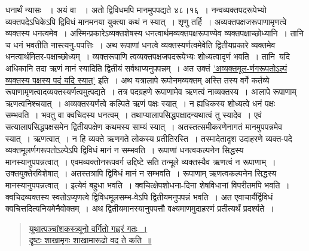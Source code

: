 \documentclass[11pt, openany]{book}
\begin{document}
\newpage

\begin{sloppypar}
\noindent धनार्थं न्यासः ~। अयं वा ~। अतो द्विविधमपि मानमुपपद्यते ४८।१६~। नन्वव्यक्तपदरूपेभ्यो व्यक्तपदेऽधिकेऽपि द्विविधं मानमनया युक्त्या कथं न स्यात्~। शृणु तर्हि~। अव्यक्तपक्षजरूपाणामृणत्वे व्यक्तस्य धनत्वमेव~। अस्मिन्प्रकारेऽव्यक्तशेषस्य धनत्वार्थमव्यक्तपक्षरूपाण्येव व्यक्तपक्षाच्छोध्यानि~। तानि च धनं भवतीति नास्त्यनु-पपत्तिः~। अथ रूपाणां धनत्वे व्यक्तस्यर्णत्वमेवेति द्वितीयप्रकारे व्यक्तमेव धनत्वार्थमितर-पक्षाच्छोध्यम्~। व्यक्तरूपाणि त्वव्यक्तपक्षजपदरूपेभ्यः शोध्यत्वादृणं भवति~। तानि~यदि अधिकानि तदा ऋणं मानं स्यादिति द्वितीयं सर्वथाप्यनुपपन्नम्~। अत उक्तं \hyperref[8.115]{'अव्यक्तमूल-र्णगरूपतोऽल्पं व्यक्तस्य पक्षस्य पदं यदि स्यात्'} इति~। अथ यत्रालापे रूपोनमव्यक्तम् अस्ति तस्य वर्गे कर्तव्ये रूपाणामृणत्वादव्यक्तस्यर्णत्वमुत्पद्यते~। तत्र पदग्रहणे रूपाणामेव ऋणत्वं नाव्यक्तस्य~। आलापे रूपाणाम् ऋणत्वनिश्चयात्~। अव्यक्तस्यर्णत्वे कल्पिते ऋणं पक्षः स्यात्~। न ह्यधिकस्य शोध्यत्वे धनं पक्षः सम्भवति~। भवतु वा क्वचिदस्य धनत्वम्~। तथाप्यालापसिद्धपक्षादन्यथात्वं तु स्यादेव~। एवं सत्यालापसिद्धपक्षसमेन द्वितीयपक्षेण कथमस्य साम्यं स्यात्~। अतस्तत्समीकरणेनागतं मानमुपपन्नमेव स्यात्~। ऋणत्वात्~। न हि व्यक्ते ऋणगते लोकस्य प्रतीतिरस्ति~। तस्मादेतादृश उदाहरणे व्यक्त-पदे व्यक्तमूलर्णगरूपतोऽल्पेऽपि द्विविधं मानं न सम्भवति~। रूपाणां धनत्वकल्पनेन सिद्धस्य मानस्यानुपपन्नत्वात्~। एवमव्यक्तोनरूपवर्ग उद्दिष्टे सति तन्मूले व्यक्तस्यैव ऋणत्वं न रूपाणाम्~। उक्तयुक्तेरविशेषात्~। अतस्तत्रापि द्विविधं मानं न सम्भवति~। रूपाणाम् ऋणत्वकल्पनेन सिद्धस्य मानस्यानुपपन्नत्वात्~। इत्येवं बहुधा भवति~। क्वचित्क्षेपशोधना-दिना शेषविधानां विपरीतमपि भवति~। क्वचिदव्यक्तस्य स्वतोऽप्यृणत्वे द्विविधमूलसम्भ-वेऽपि द्वितीयमनुपपन्नं भवति~। अत एवाचार्यैर्द्विविधं क्वचित्तदित्यनियमेनैवोक्तम्~। अथ द्वितीयमानस्यानुपपत्तौ वक्ष्यमाणमुदाहरणं प्रतीत्यर्थं प्रदर्श्यते~। 

\begin{quote}
\hyperref[8.125]{यूथात्पञ्चांशकस्त्र्यूनो वर्गितो गह्वरं गतः~।\\
दृष्टः शाखामृगः शाखामारूढो वद ते कति~॥}
\end{quote}


\end{sloppypar}
\end{document}
